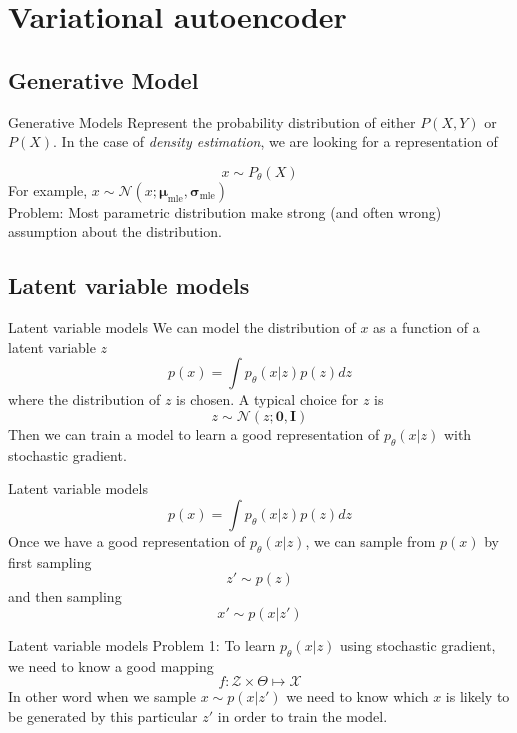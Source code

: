 \documentclass{beamer}
\begin{document}
\section{Variational autoencoder}

\subsection{Generative Model}

\begin{frame}{Generative Models}
Represent the probability distribution of either $P(X,Y)$ or $P(X)$. In the case of \textit{density estimation}, we are looking for a representation of

\huge
\[
	x \sim P_\theta(X)
\]
\normalsize
For example, $x\sim \mathcal{N}(x;\bm{\mu}_{\text{mle}}, \bm{\sigma}_{\text{mle}})$ \\

Problem: Most parametric distribution make strong (and often wrong) assumption about the distribution.
\end{frame}

\subsection{Latent variable models}

\begin{frame}{Latent variable models}
	We can model the distribution of $x$ as a function of a latent variable $z$
	\[
	p(x) = \int p_\theta (x|z) p(z) dz
	\]
	where the distribution of $z$ is chosen. A typical choice for $z$ is 
	\[
		z\sim \mathcal{N}(z;\bm{0}, \bm{I})
	\]
	Then we can train a model to learn a good representation of $p_\theta (x|z)$ with stochastic gradient.
\end{frame}

\begin{frame}{Latent variable models}
	\[
		p(x) = \int p_\theta (x|z) p(z) dz
	\]
	Once we have a good representation of $p_\theta (x|z)$, we can sample from $p(x)$ by first sampling
	\[
		z'\sim p(z)
	\]
	and then sampling\\
	\[
		x'\sim p(x|z')
	\]
\end{frame}

\begin{frame}{Latent variable models}
	Problem 1: To learn $p_\theta(x|z)$ using stochastic gradient, we need to know a good mapping 
	\[
		f: \mathcal{Z}\times \Theta \mapsto \mathcal{X}
	\]
	In other word when we sample $x\sim p(x|z')$ we need to know which $x$ is likely to be generated by this particular $z'$ in order to train the model.
\end{frame}
\end{document}
